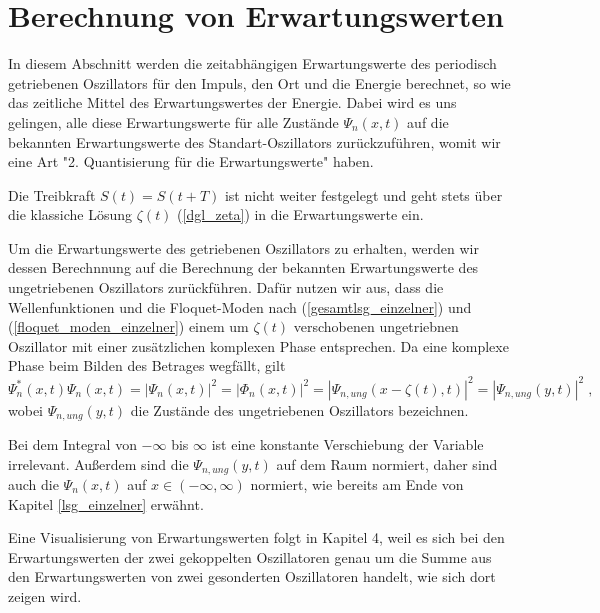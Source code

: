 \section{Berechnung von Erwartungswerten}
  In diesem Abschnitt werden die zeitabhängigen Erwartungswerte des periodisch getriebenen Oszillators für den Impuls, den Ort und die Energie berechnet, so wie das zeitliche Mittel des Erwartungswertes der Energie.
  Dabei wird es uns gelingen, alle diese Erwartungswerte für alle Zustände $\Psi_n(x,t)$ auf die bekannten Erwartungswerte des Standart-Oszillators zurückzuführen, womit wir eine Art "2. Quantisierung für die Erwartungswerte" haben.

  Die Treibkraft $S(t)=S(t+T)$ ist nicht weiter festgelegt und geht stets über die klassiche Lösung $\zeta(t)$ (\ref{dgl_zeta}) in die Erwartungswerte ein.

  Um die Erwartungswerte des getriebenen Oszillators zu erhalten, werden wir dessen Berechnnung auf die Berechnung der bekannten Erwartungswerte des ungetriebenen Oszillators zurückführen.
  Dafür nutzen wir aus, dass die Wellenfunktionen und die Floquet-Moden nach (\ref{gesamtlsg_einzelner}) und (\ref{floquet_moden_einzelner}) einem um $\zeta(t)$ verschobenen ungetriebnen Oszillator mit einer zusätzlichen komplexen Phase entsprechen.
  Da eine komplexe Phase beim Bilden des Betrages wegfällt, gilt
  \begin{equation}
    \Psi_n^*(x,t)\Psi_n(x,t) = |\Psi_n(x,t)|^2 = |\Phi_n(x,t)|^2 = |\Psi_{n,ung}(x-\zeta(t),t)|^2 = |\Psi_{n,ung}(y,t)|^2 \; ,
    \label{betrag_einzelner}
  \end{equation}
  wobei $\Psi_{n,ung}(y,t)$ die Zustände des ungetriebenen Oszillators bezeichnen.

  Bei dem Integral von $-\infty$ bis $\infty$ ist eine konstante Verschiebung der Variable irrelevant.
  Außerdem sind die $\Psi_{n,ung}(y,t)$ auf dem Raum normiert, daher sind auch die $\Psi_n(x,t)$ auf $x \in (-\infty,\infty)$ normiert, wie bereits am Ende von Kapitel \ref{lsg_einzelner} erwähnt.

  Eine Visualisierung von Erwartungswerten folgt in Kapitel 4, weil es sich bei den Erwartungswerten der zwei gekoppelten Oszillatoren genau um die Summe aus den Erwartungswerten von zwei gesonderten Oszillatoren handelt, wie sich dort zeigen wird.

